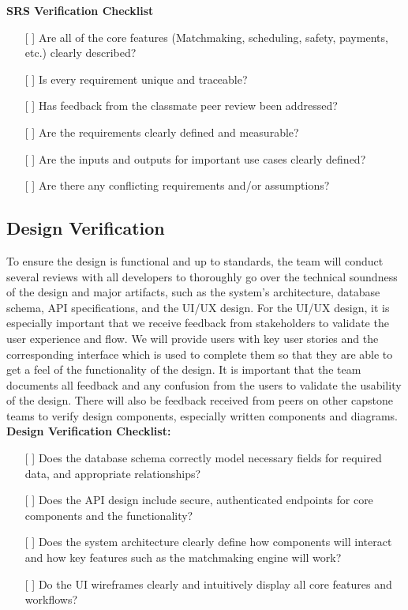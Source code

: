 \documentclass[12pt, titlepage]{article}
\begin{document}
\noindent \textbf{SRS Verification Checklist}
\begin{itemize}
    \item[{[ ]}] Are all of the core features (Matchmaking, scheduling, safety, payments, etc.) clearly described?
    \item[{[ ]}] Is every requirement unique and traceable?
    \item[{[ ]}] Has feedback from the classmate peer review been addressed?
    \item[{[ ]}] Are the requirements clearly defined and measurable?
    \item[{[ ]}] Are the inputs and outputs for important use cases clearly defined?
    \item[{[ ]}] Are there any conflicting requirements and/or assumptions?

\end{itemize}
\subsection{Design Verification}

To ensure the design is functional and up to standards, the team will conduct several reviews with all developers to thoroughly go over the technical soundness of the design and major artifacts, such as the system’s architecture, database schema, API specifications, and the UI/UX design. 
For the UI/UX design, it is especially important that we receive feedback from stakeholders to validate the user experience and flow. We will provide users with key user stories and the corresponding interface which is used to complete them so that they are able to get a feel of the functionality of the design. 
It is important that the team documents all feedback and any confusion from the users to validate the usability of the design. There will also be feedback received from peers on other capstone teams to verify design components, especially written components and diagrams. \\

\noindent \textbf{Design Verification Checklist:}
\begin{itemize}
  \item[{[ ]}] Does the database schema correctly model necessary fields for required data, and appropriate relationships? 
  \item[{[ ]}] Does the API design include secure, authenticated endpoints for core components and the functionality? 
  \item[{[ ]}] Does the system architecture clearly define how components will interact and how key features such as the matchmaking engine will work? 
  \item[{[ ]}] Do the UI wireframes clearly and intuitively display all core features and workflows? 
\end{itemize}
\end{document}
